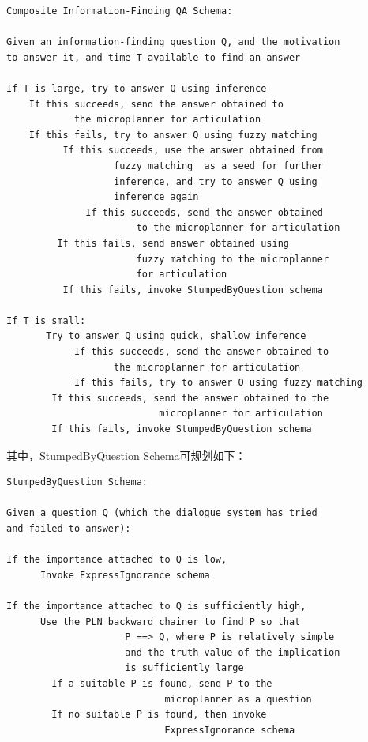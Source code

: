 \begin{verbatim}
Composite Information-Finding QA Schema:

Given an information-finding question Q, and the motivation
to answer it, and time T available to find an answer

If T is large, try to answer Q using inference
    If this succeeds, send the answer obtained to
            the microplanner for articulation
    If this fails, try to answer Q using fuzzy matching
          If this succeeds, use the answer obtained from
                   fuzzy matching  as a seed for further
                   inference, and try to answer Q using
                   inference again
              If this succeeds, send the answer obtained
                       to the microplanner for articulation
	     If this fails, send answer obtained using
                       fuzzy matching to the microplanner
                       for articulation
          If this fails, invoke StumpedByQuestion schema	

If T is small:
       Try to answer Q using quick, shallow inference
            If this succeeds, send the answer obtained to
                   the microplanner for articulation
            If this fails, try to answer Q using fuzzy matching
		If this succeeds, send the answer obtained to the
                           microplanner for articulation
		If this fails, invoke StumpedByQuestion schema
\end{verbatim}

\noindent 其中，StumpedByQuestion Schema可规划如下：

\begin{verbatim}
StumpedByQuestion Schema:

Given a question Q (which the dialogue system has tried
and failed to answer):

If the importance attached to Q is low,
      Invoke ExpressIgnorance schema
				
If the importance attached to Q is sufficiently high,
      Use the PLN backward chainer to find P so that
                     P ==> Q, where P is relatively simple
                     and the truth value of the implication
                     is sufficiently large
		If a suitable P is found, send P to the
                            microplanner as a question
		If no suitable P is found, then invoke
                            ExpressIgnorance schema

\end{verbatim}

